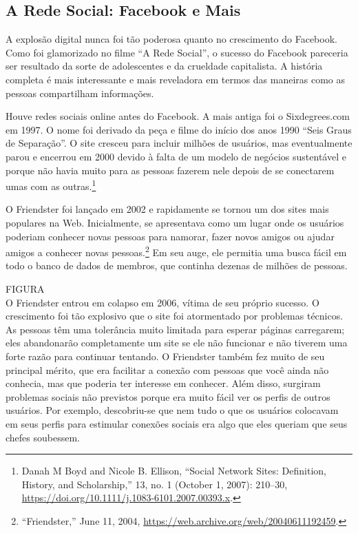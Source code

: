 \subsection{A Rede Social: Facebook e Mais}
\label{gatekeepers:a-rede-social}

A explosão digital nunca foi tão poderosa quanto no crescimento do Facebook. Como foi
glamorizado no filme ``A Rede Social'', o sucesso do Facebook pareceria ser resultado da sorte
de adolescentes e da crueldade capitalista. A história completa é mais interessante e mais
reveladora em termos das maneiras como as pessoas compartilham informações.

Houve redes sociais online antes do Facebook. A mais antiga foi o Sixdegrees.com em 1997. O nome
foi derivado da peça e filme do início dos anos 1990 ``Seis Graus de Separação''. O site cresceu
para incluir milhões de usuários, mas eventualmente parou e encerrou em 2000 devido à falta de um
modelo de negócios sustentável e porque não havia muito para as pessoas fazerem nele depois de se
conectarem umas com as outras.\footnote{Danah M Boyd and Nicole B. Ellison, ``Social Network Sites:
Definition, History, and Scholarship,''  13,
no. 1 (October 1, 2007): 210–30, \url{https://doi.org/10.1111/j.1083-6101.2007.00393.x}.}

O Friendster foi lançado em 2002 e rapidamente se tornou um dos sites mais populares na Web.
Inicialmente, se apresentava como um lugar onde os usuários poderiam conhecer novas pessoas para
namorar, fazer novos amigos ou ajudar amigos a conhecer novas pessoas.\footnote{``Friendster,''
June 11, 2004, \url{https://web.archive.org/web/20040611192459}.} Em seu auge, ele permitia uma
busca fácil em todo o banco de dados de membros, que continha dezenas de milhões de pessoas.

FIGURA\\

O Friendster entrou em colapso em 2006, vítima de seu próprio sucesso. O crescimento foi tão
explosivo que o site foi atormentado por problemas técnicos. As pessoas têm uma tolerância muito
limitada para esperar páginas carregarem; eles abandonarão completamente um site se ele não
funcionar e não tiverem uma forte razão para continuar tentando. O Friendster também fez muito de
seu principal mérito, que era facilitar a conexão com pessoas que você ainda não conhecia, mas
que poderia ter interesse em conhecer. Além disso, surgiram problemas sociais não previstos porque
era muito fácil ver os perfis de outros usuários. Por exemplo, descobriu-se que nem tudo o que os
usuários colocavam em seus perfis para estimular conexões sociais era algo que eles queriam que
seus chefes soubessem.

